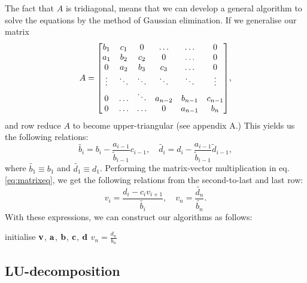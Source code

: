 The fact that $A$ is tridiagonal, means that we can develop a general algorithm
to solve the equations by the method of Gaussian elimination. If we generalise
our matrix
  \[A =
    \mqty[b_1 & c_1 & 0 & \hdots & \hdots & 0 \\
          a_1 & b_2 & c_2 & 0 & \hdots & 0 \\
          0 & a_2 & b_3 & c_3 & \hdots & 0 \\
          \vdots & \ddots & \ddots & \ddots & \ddots & \vdots \\
          0 & \hdots & \ddots & a_{n-2} & b_{n-1} & c_{n-1} \\
          0 & \hdots & \hdots & 0 & a_{n-1} & b_n],
  \]
and row reduce $A$ to become upper-triangular (see appendix A.)
This yields us the following relations:
  \begin{equation}
    \widetilde{b_i} = b_i - \frac{a_{i-1}}{\tilde{b}_{i-1}}c_{i-1}, \quad
    \widetilde{d_i} = d_i - \frac{a_{i-1}}{\tilde{b}_{i-1}}\tilde{d}_{i-1},
  \end{equation}
where $\widetilde{b_1} \equiv b_1$ and $\widetilde{d_1} \equiv d_1$.
Performing the matrix-vector multiplication in eq. \ref{eq:matrixeq}, we get
the following relations from the second-to-last and last row:
  \begin{equation}
    v_i = \frac{d_i - c_iv_{i+1}}{\widetilde{b_i}}, \quad
    v_n = \frac{\widetilde{d_n}}{\widetilde{b_n}}.
  \end{equation}
With these expressions, we can construct our algorithms as follows:
  \begin{algorithm}[htbp]
    \SetAlgoLined
    initialise $\vb{v}$, $\vb{a}$, $\vb{b}$, $\vb{c}$, $\vb{d}$\;
    $v_n = \frac{d_n}{b_n}$\;
  \end{algorithm}


\subsection{LU-decomposition}
\label{sec:LU}
